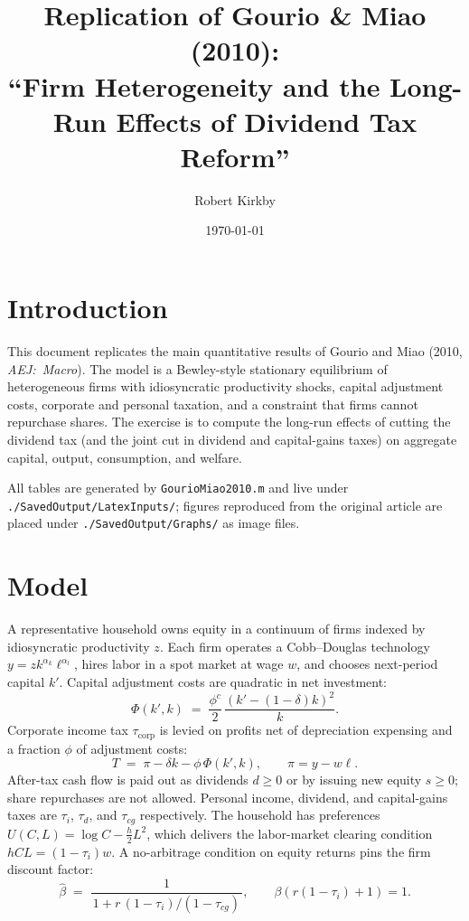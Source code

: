 \documentclass[11pt]{article}
\title{Replication of Gourio \& Miao (2010): \\
``Firm Heterogeneity and the Long-Run Effects of Dividend Tax Reform''}
\author{Robert Kirkby}
\date{\today}
\begin{document}
\maketitle

\section{Introduction}
This document replicates the main quantitative results of Gourio and Miao
(2010, \emph{AEJ:~Macro}). The model is a Bewley-style stationary equilibrium
of heterogeneous firms with idiosyncratic productivity shocks, capital
adjustment costs, corporate and personal taxation, and a constraint that
firms cannot repurchase shares. The exercise is to compute the long-run
effects of cutting the dividend tax (and the joint cut in dividend and
capital-gains taxes) on aggregate capital, output, consumption, and welfare.

All tables are generated by \texttt{GourioMiao2010.m} and live under
\texttt{./SavedOutput/LatexInputs/}; figures reproduced from the original
article are placed under \texttt{./SavedOutput/Graphs/} as image files.

\section{Model}
A representative household owns equity in a continuum of firms indexed by
idiosyncratic productivity $z$. Each firm operates a Cobb--Douglas technology
$y = z k^{\alpha_k} \ell^{\alpha_l}$, hires labor in a spot market at wage
$w$, and chooses next-period capital $k'$. Capital adjustment costs are
quadratic in net investment:
\[
\Phi(k',k) \;=\; \frac{\phi^{c}}{2}\,\frac{(k'-(1-\delta)k)^{2}}{k}.
\]
Corporate income tax $\tau_{\text{corp}}$ is levied on profits net of
depreciation expensing and a fraction $\phi$ of adjustment costs:
\[
T \;=\; \pi - \delta k - \phi\,\Phi(k',k), \qquad \pi = y - w\ell.
\]
After-tax cash flow is paid out as dividends $d \ge 0$ or by issuing new
equity $s \ge 0$; share repurchases are not allowed. Personal income, dividend,
and capital-gains taxes are $\tau_{i}$, $\tau_{d}$, and $\tau_{cg}$ respectively.
The household has preferences $U(C,L) = \log C - \tfrac{h}{2}L^{2}$, which
delivers the labor-market clearing condition $h C L = (1-\tau_{i}) w$.
A no-arbitrage condition on equity returns pins the firm discount factor:
\[
\hat{\beta} \;=\; \frac{1}{\,1 + r\,(1-\tau_{i})/(1-\tau_{cg})\,},
\qquad \beta(r(1-\tau_{i}) + 1) = 1.
\]
\end{document}
